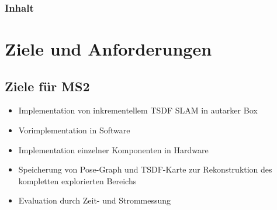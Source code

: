 \documentclass{beamer}
\begin{document}
{
\begin{frame}
\titlepage
\end{frame}}

\begin{frame}
\frametitle{Inhalt}
\tableofcontents
\end{frame}



\section{Ziele und Anforderungen}
\begin{frame}{}
\begin{center}
\end{center}
\end{frame}

\subsection{Ziele für MS2}
\begin{frame}{\subsecname}
\begin{itemize}
\item Implementation von inkrementellem TSDF SLAM in \glqq{}autarker\grqq{} Box
\item Vorimplementation in Software
\item Implementation einzelner Komponenten in Hardware
\item Speicherung von Pose-Graph und TSDF-Karte zur Rekonstruktion des kompletten explorierten Bereichs
\item Evaluation durch Zeit- und Strommessung
\end{itemize}
\end{frame}
\end{document}

